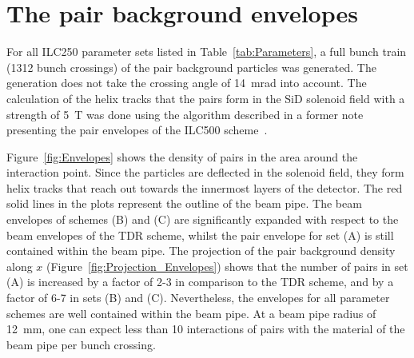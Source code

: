 \section{The pair background envelopes}
\label{sec:Envelopes}
For all ILC250 parameter sets listed in Table~\ref{tab:Parameters}, a full bunch train (1312 bunch crossings) of the pair background particles was generated.
The \guineapig generation does not take the crossing angle of \SI{14}{\milli\radian} into account.
The calculation of the helix tracks that the pairs form in the SiD solenoid field with a strength of \SI{5}{\tesla} was done using the algorithm described in a former note presenting the pair envelopes of the ILC500 scheme~\cite{HelixProceeding}.

Figure~\ref{fig:Envelopes} shows the density of pairs in the area around the interaction point.
Since the particles are deflected in the solenoid field, they form helix tracks that reach out towards the innermost layers of the detector.
The red solid lines in the plots represent the outline of the beam pipe.
The beam envelopes of schemes (B) and (C) are significantly expanded with respect to the beam envelopes of the TDR scheme, whilst the pair envelope for set (A) is still contained within the beam pipe.
The projection of the pair background density along $x$ (Figure~\ref{fig:Projection_Envelopes}) shows that the number of pairs in set (A) is increased by a factor of 2-3 in comparison to the TDR scheme, and by a factor of 6-7 in sets (B) and (C).
Nevertheless, the envelopes for all parameter schemes are well contained within the beam pipe.
At a beam pipe radius of \SI{12}{\milli\meter}, one can expect less than 10 interactions of pairs with the material of the beam pipe per bunch crossing.

